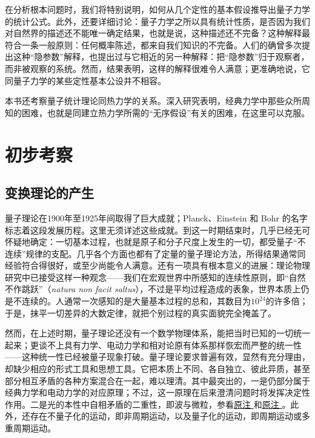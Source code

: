 \documentclass[fontsize=13pt,twoside,openany,headings=normal,parskip=false,bookmarkpackage=false,DIV=calc]{scrbook}
\begin{document}
在分析根本问题时，我们将特别说明，如何从几个定性的基本假设推导出量子力学的统计公式。此外，还要详细讨论：量子力学之所以具有统计性质，是否因为我们对自然界的描述还不能唯一确定结果，也就是说，这种描述还不完备？这种解释最符合一条一般原则：任何概率陈述，都来自我们知识的不完备。人们的确曾多次提出这种“隐参数”解释，也提出过与它相近的另一种解释：把“隐参数”归于观察者，而非被观察的系统。然而，结果表明，这样的解释很难令人满意；\hypertarget{origpage-3}{}\label{origpage-3}更准确地说，它同量子力学的某些定性基本公设并不相容。

本书还考察量子统计理论同热力学的关系。深入研究表明，经典力学中那些众所周知的困难，也就是同建立热力学所需的“无序假设”有关的困难，在这里可以克服。

\chapter{初步考察}\label{chap:I}\hypertarget{origpage-4}{}\label{origpage-4}\section{变换理论的产生}\label{sec:I.1}
量子理论在1900年至1925年间取得了巨大成就；Planck、Einstein 和 Bohr 的名字标志着这段发展历程。这里无须详述这些成就。到这一时期结束时，几乎已经无可怀疑地确定：一切基本过程，也就是原子和分子尺度上发生的一切，都受量子“不连续”规律的支配。几乎各个方面也都有了定量的量子理论方法，所得结果通常同经验符合得很好，或至少尚能令人满意。还有一项具有根本意义的进展：理论物理研究中已接受这样一种观念——我们在宏观世界中所感知的连续性原则，即“自然不作跳跃”（\emph{natura non facit saltus}），不过是平均过程造成的表象，世界本质上仍是不连续的。人通常一次感知的是大量基本过程的总和，其数目为$10^{24}$的许多倍；于是，抹平一切差异的大数定律，就把个别过程的真实面貌完全掩盖了。

然而，在上述时期，量子理论还没有一个数学物理体系，能把当时已知的一切统一起来；更谈不上具有力学、电动力学和相对论原有体系那样恢宏而严整的统一性——这种统一性已经被量子现象打破。量子理论要求普遍有效，显然有充分理由，却缺少相应的形式工具和思想工具。它把本质上不同、各自独立、彼此异质，甚至部分相互矛盾的各种方案混合在一起，难以理清。其中最突出的，一是仍部分属于经典力学和电动力学的对应原理；不过，这一原理在后来澄清问题时将发挥决定性作用。二是光的本性中自相矛盾的二重性，即波与微粒，参看\CJKglue \hyperlink{note-5}{原注 } 和\CJKglue \hyperlink{note-148}{原注 }。此外，还存在不量子化的运动，即非周期运动，以及量子化的运动，即周期运动或多重周期运动。
\end{document}
